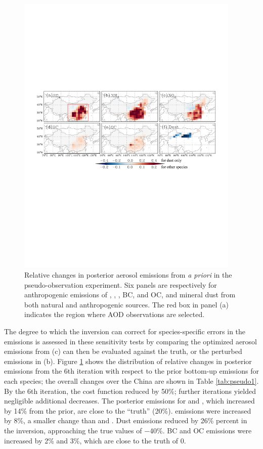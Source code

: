  \begin{figure}[t]  \centering  \includegraphics[width={0.95\textwidth}]{figures/a2.pdf}
  \caption{Relative changes in posterior aerosol emissions from \textit{a priori}
   in the pseudo-observation experiment.
   Six panels are respectively for anthropogenic emissions of , ,
   , BC, and OC, and mineral dust from both natural and anthropogenic sources.
   The red box in panel (a) indicates the region where AOD observations are selected. }
  \label{fig:pseudo1}
 \end{figure}

 The degree to which the inversion can correct for species-specific errors in the emissions 
 is assessed in these sensitivity tests by comparing the optimized aerosol emissions 
 from (c) can then be evaluated against the truth, or the perturbed emissions in (b).  
 Figure \ref{fig:pseudo1} shows the distribution of relative changes in posterior emissions 
 from the 6th iteration with respect to the prior bottom-up emissions for each species; 
 the overall changes over the China are shown in Table \ref{tab:pseudo1}.
 By the 6th iteration, the cost function reduced by 50\%; 
 further iterations yielded negligible additional decreases. 
 The posterior emissions for  and , which increased by 14\% from the prior, 
 are close to the “truth” (20\%).  emissions were increased by 8\%, 
 a smaller change than  and . 
 Dust emissions reduced by 26\% percent in the inversion, 
 approaching the true values of $-$40\%.
 BC and OC emissions were increased by 2\% and 3\%, which are close to the truth of 0. 

